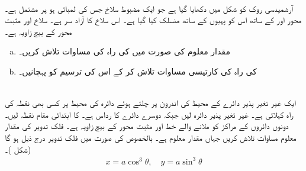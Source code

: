 \\
آرشمیدسی روک کو شکل  میں دکھایا گیا ہے جو ایک مضبوط سلاخ جس کی لمبائی  ہو پر مشتمل ہے۔محور  اور   کے ساتھ اس کو پہیوں کے ساتھ منسلک کیا گیا ہے۔ اس سلاخ کا آزاد سر  ہے۔ سلاخ اور مثبت  محور کے بیچ زاویہ  ہے۔
\begin{enumerate}[a.]
\item
مقدار معلوم  کی صورت میں  کی راہ کی مساوات تلاش کریں۔
\item
{} کی راہ کی کارتیسی مساوات تلاش کر کے اس کی ترسیم کو پہچانیں۔
\end{enumerate}
\\
ایک غیر تغیر پذیر دائرے کے محیط کی اندرون پر چلتے ہوئے دائرہ کی محیط پر کسی بھی نقطہ  کی راہ  کہلاتی ہے۔ غیر تغیر پذیر دائرہ  لیں جبکہ دوسرے دائرے کا رداس  ہے۔  کا ابتدائی مقام نقطہ  لیں۔ دونوں دائروں کے مراکز کو ملانے والے خط اور مثبت  محور کے بیچ زاویہ  ہے۔  فلک تدویر کی مقدار معلوم مساوات تلاش کریں جہاں مقدار معلوم  ہے۔ بالخصوص  کی صورت میں فلک تدویر درج ذیل  ہو گا (شکل )۔
\begin{align*}
x=a\cos^3\theta,\quad y=a\sin^3\theta
\end{align*}
